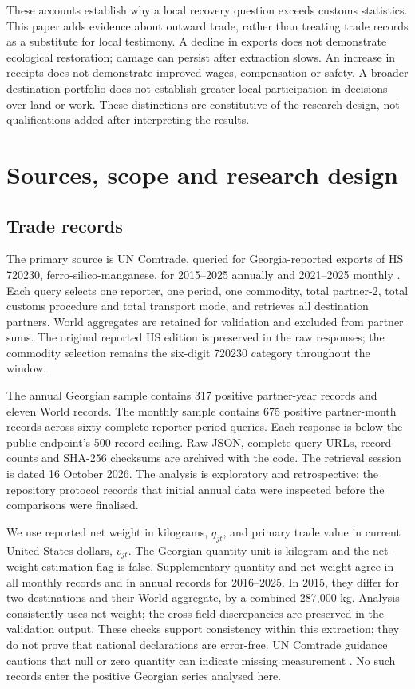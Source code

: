 \documentclass[11pt,a4paper]{article}
\begin{document}
These accounts establish why a local recovery question exceeds customs statistics. This paper adds evidence about outward trade, rather than treating trade records as a substitute for local testimony. A decline in exports does not demonstrate ecological restoration; damage can persist after extraction slows. An increase in receipts does not demonstrate improved wages, compensation or safety. A broader destination portfolio does not establish greater local participation in decisions over land or work. These distinctions are constitutive of the research design, not qualifications added after interpreting the results.

\section{Sources, scope and research design}
\subsection{Trade records}
The primary source is UN Comtrade, queried for Georgia-reported exports of HS 720230, ferro-silico-manganese, for 2015--2025 annually and 2021--2025 monthly \citep{comtrade2026}. Each query selects one reporter, one period, one commodity, total partner-2, total customs procedure and total transport mode, and retrieves all destination partners. World aggregates are retained for validation and excluded from partner sums. The original reported HS edition is preserved in the raw responses; the commodity selection remains the six-digit 720230 category throughout the window.

The annual Georgian sample contains 317 positive partner-year records and eleven World records. The monthly sample contains 675 positive partner-month records across sixty complete reporter-period queries. Each response is below the public endpoint's 500-record ceiling. Raw JSON, complete query URLs, record counts and SHA-256 checksums are archived with the code. The retrieval session is dated 16 October 2026. The analysis is exploratory and retrospective; the repository protocol records that initial annual data were inspected before the comparisons were finalised.

We use reported net weight in kilograms, $q_{jt}$, and primary trade value in current United States dollars, $v_{jt}$. The Georgian quantity unit is kilogram and the net-weight estimation flag is false. Supplementary quantity and net weight agree in all monthly records and in annual records for 2016--2025. In 2015, they differ for two destinations and their World aggregate, by a combined 287,000 kg. Analysis consistently uses net weight; the cross-field discrepancies are preserved in the validation output. These checks support consistency within this extraction; they do not prove that national declarations are error-free. UN Comtrade guidance cautions that null or zero quantity can indicate missing measurement \citep{unquantity}. No such records enter the positive Georgian series analysed here.
\end{document}
